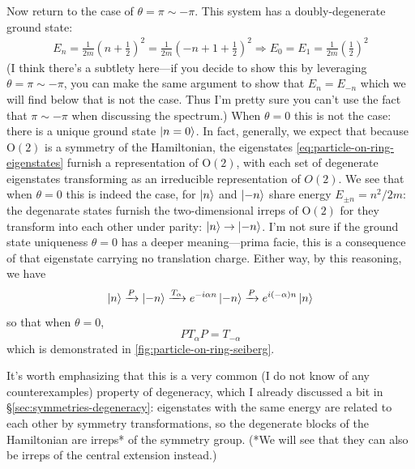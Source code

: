 \documentclass{report}
\begin{document}
Now return to the case of $ \theta = \pi \sim -\pi $. This system has a doubly-degenerate 
ground state:
\begin{align*}
	E_n = \frac{1}{2m}\left(n + \frac{1}{2}\right)^2 
	= 
	\frac{1}{2m} \left(-n + 1 + \frac{1}{2}\right)^2
	\Longrightarrow E_0 = E_1 = \frac{1}{2m}\left(\frac{1}{2}\right)^2
\end{align*}
(I think there's a subtlety here---if you decide to show this by leveraging 
$ \theta= \pi\sim -\pi $, you can make the same argument to show that 
$ E_{n} = E_{-n} $ which we will find below that is not the case. Thus I'm pretty 
sure you can't use the fact that $ \pi \sim-\pi $ when discussing the spectrum.)
When $ \theta=0 $ this is not the case: there is a unique ground state $ \ket{n=0} $. 
In fact, generally, we expect that because $ \text{O}(2) $ is a symmetry 
of the Hamiltonian, the eigenstates \cref{eq:particle-on-ring-eigenstates} 
furnish a representation of $ \text{O}(2) $, with each set of degenerate 
eigenstates transforming as an irreducible representation of $ O(2)$. We 
see that when $ \theta = 0 $ this is indeed the case, for $ \ket{n} $ and 
$ \ket{-n} $ share energy $ E_{\pm n} = n^2/2m $: the degenarate states furnish 
the two-dimensional irreps of $ \text{O}(2) $ for they transform into each other
under parity: $ \ket{n} \rightarrow \ket{-n} $. I'm not sure if the ground state 
uniqueness $ \theta=0 $ has a deeper meaning---prima facie, this is a consequence 
of that eigenstate carrying no translation charge. Either way, by this reasoning, 
we have 
\begin{equation*}
	\ket{n} \xrightarrow{P} \ket{-n} \xrightarrow{T_\alpha} e^{-i\alpha n}\ket{-n} 
		\xrightarrow{P} e^{i(-\alpha)n}\ket{n}
\end{equation*}
so that when $ \theta = 0 $, 
\begin{equation*}
	P T_\alpha P = T_{-\alpha}
\end{equation*}
which is demonstrated in \cref{fig:particle-on-ring-seiberg}. 

\begin{alertbox}[Aside]
It's worth emphasizing that this is a very common (I do not know of any
counterexamples) property of degeneracy, which I already discussed a bit 
in \S \ref{sec:symmetries-degeneracy}: eigenstates with the same energy are 
related to each other by symmetry transformations, so the degenerate blocks of 
the Hamiltonian are irreps* of the symmetry group. (*We will see that they can
also be irreps of the central extension instead.)
\end{alertbox}
\end{document}
